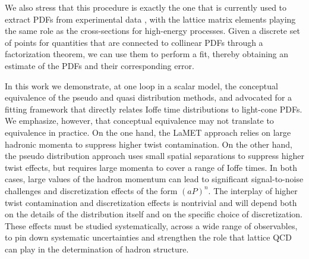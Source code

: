 We also stress that this procedure is exactly the one that is currently used to
extract PDFs from experimental data \cite{Ball:2017nwa, Dulat:2015mca,
Alekhin:2017kpj, Martin:2009iq, Buckley:2014ana}, with the lattice matrix
elements playing the same role as the cross-sections for high-energy processes.
Given a discrete set of points for quantities that are connected to collinear
PDFs through a factorization theorem, we can use them to perform a fit, thereby
obtaining an estimate of the PDFs and their corresponding error.
  
In this work we demonstrate, at one loop in a scalar model, the conceptual
equivalence of the pseudo and quasi distribution methods, and advocated for a
fitting framework that directly relates Ioffe time distributions to light-cone
PDFs. We emphasize, however, that conceptual equivalence may not translate to
equivalence in practice. On the one hand, the LaMET approach relies on large
hadronic momenta to suppress higher twist contamination. On the other hand, the
pseudo distribution approach uses small spatial separations to suppress higher
twist effects, but requires large momenta to cover a range of Ioffe times. In
both cases, large values of the hadron momentum can lead to significant
signal-to-noise challenges and discretization effects of the form $(aP)^n$. The
interplay of higher twist contamination and discretization effects is nontrivial
and will depend both on the details of the distribution itself and on the
specific choice of discretization. These effects must be studied systematically,
across a wide range of observables, to pin down systematic uncertainties and
strengthen the role that lattice QCD can play in the determination of hadron
structure.
